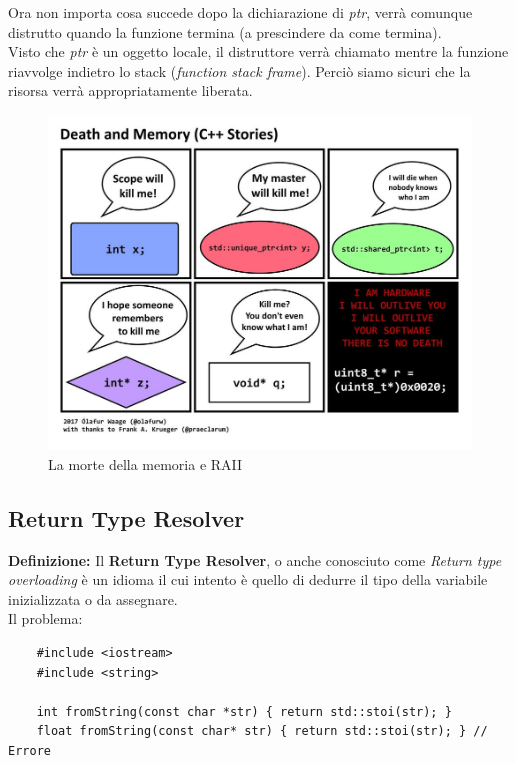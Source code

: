 \textsf{\small Ora non importa cosa succede dopo la dichiarazione di \emph{ptr}, verrà comunque distrutto quando la funzione termina (a prescindere da come termina). } \\

\textsf{\small Visto che \emph{ptr} è un oggetto locale, il distruttore verrà chiamato mentre la funzione riavvolge indietro lo stack (\emph{function stack frame}). Perciò siamo sicuri che la risorsa verrà appropriatamente liberata.} \\

\begin{figure}[H]
	\centering
	\includegraphics[width=1\textwidth, height=1\textheight, keepaspectratio]{./imgs/death_and_memory.jpg}
	\caption{La morte della memoria e RAII}
	\label{fig:death_and_memory}
\end{figure}

\subsection{Return Type Resolver}

\textsf{\small \textbf{Definizione: } Il \textbf{Return Type Resolver}, o anche conosciuto come \emph{Return type overloading} è un idioma il cui intento è quello di dedurre il tipo della variabile inizializzata o da assegnare.} \\

\textsf{\small Il problema: } \\

\begin{lstlisting}
	#include <iostream>
	#include <string>
	
	int fromString(const char *str) { return std::stoi(str); }
	float fromString(const char* str) { return std::stoi(str); } // Errore
\end{lstlisting}


